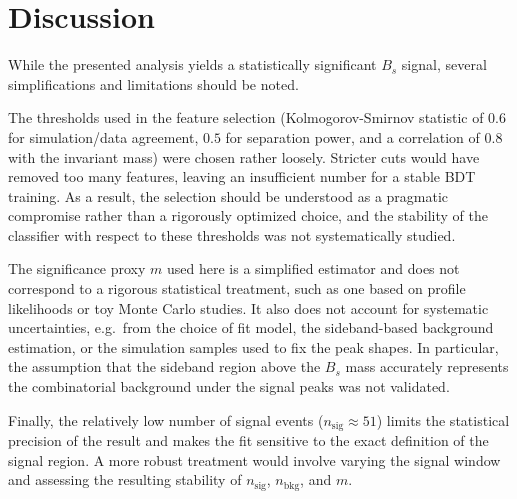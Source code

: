 \section{Discussion}
\label{sec:Discussion}
While the presented analysis yields a statistically significant $B_s$ signal, 
several simplifications and limitations should be noted.

The thresholds used in the feature selection (Kolmogorov-Smirnov 
statistic of $0.6$ for simulation/data agreement, $0.5$ for separation 
power, and a correlation of $0.8$ with the invariant mass) were chosen 
rather loosely. Stricter cuts would have removed too many features, 
leaving an insufficient number for a stable BDT training. As a result, 
the selection should be understood as a pragmatic compromise rather 
than a rigorously optimized choice, and the stability of the classifier 
with respect to these thresholds was not systematically studied.

The significance proxy $m$ used here is a simplified estimator and 
does not correspond to a rigorous statistical treatment, such as one 
based on profile likelihoods or toy Monte Carlo studies. It also does 
not account for systematic uncertainties, e.g.\ from the choice of fit 
model, the sideband-based background estimation, or the simulation 
samples used to fix the peak shapes. In particular, the assumption 
that the sideband region above the $B_s$ mass accurately represents 
the combinatorial background under the signal peaks was not validated.

Finally, the relatively low number of signal events ($n_{\text{sig}} 
\approx 51$) limits the statistical precision of the result and makes 
the fit sensitive to the exact definition of the signal region. A more 
robust treatment would involve varying the signal window and assessing 
the resulting stability of $n_{\text{sig}}$, $n_{\text{bkg}}$, and $m$.